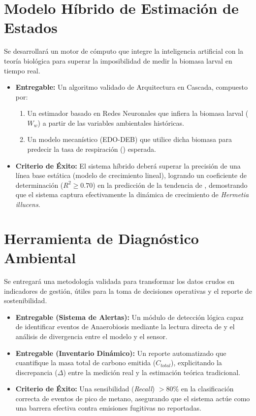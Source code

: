 \section{Modelo Híbrido de Estimación de Estados}Se desarrollará un motor de cómputo que integre la inteligencia artificial con la teoría biológica para superar la imposibilidad de medir la biomasa larval en tiempo real.\begin{itemize}\item \textbf{Entregable:} Un algoritmo validado de Arquitectura en Cascada, compuesto por:\begin{enumerate}\item Un estimador basado en Redes Neuronales que infiera la biomasa larval ($W_w$) a partir de las variables ambientales históricas.\item Un modelo mecanístico (EDO-DEB) que utilice dicha biomasa para predecir la tasa de respiración () esperada.\end{enumerate}\item \textbf{Criterio de Éxito:} El sistema híbrido deberá superar la precisión de una línea base estática (modelo de crecimiento lineal), logrando un coeficiente de determinación ($R^2 \geq 0.70$) en la predicción de la tendencia de , demostrando que el sistema captura efectivamente la dinámica de crecimiento de \textit{Hermetia illucens}.\end{itemize}

\section{Herramienta de Diagnóstico Ambiental}Se entregará una metodología validada para transformar los datos crudos en indicadores de gestión, útiles para la toma de decisiones operativas y el reporte de sostenibilidad.\begin{itemize}\item \textbf{Entregable (Sistema de Alertas):} Un módulo de detección lógica capaz de identificar eventos de Anaerobiosis mediante la lectura directa de  y el análisis de divergencia entre el modelo y el sensor.\item \textbf{Entregable (Inventario Dinámico):} Un reporte automatizado que cuantifique la masa total de carbono emitida ($C_{total}$), explicitando la discrepancia ($\Delta$) entre la medición real y la estimación teórica tradicional.\item \textbf{Criterio de Éxito:} Una sensibilidad (\textit{Recall}) $> 80\%$ en la clasificación correcta de eventos de pico de metano, asegurando que el sistema actúe como una barrera efectiva contra emisiones fugitivas no reportadas.\end{itemize}

